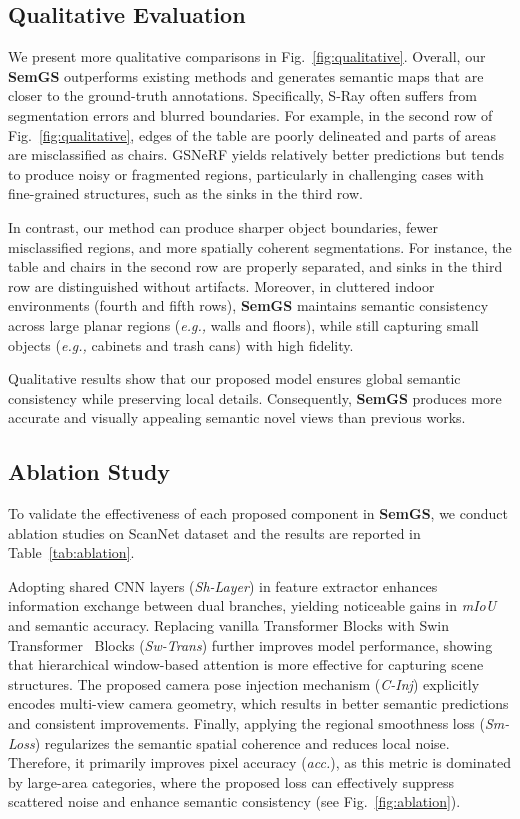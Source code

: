 \documentclass[letterpaper, 10 pt, conference]{ieeeconf}  %
\begin{document}
\subsection{Qualitative Evaluation}
We present more qualitative comparisons in Fig.~\ref{fig:qualitative}. Overall, our \textbf{SemGS} outperforms existing methods and generates semantic maps that are closer to the ground-truth annotations. 
Specifically, S-Ray often suffers from segmentation errors and blurred boundaries. For example, in the second row of Fig.~\ref{fig:qualitative}, edges of the table are poorly delineated and parts of areas are misclassified as chairs. GSNeRF yields relatively better predictions but tends to produce noisy or fragmented regions, particularly in challenging cases with fine-grained structures, such as the sinks in the third row.

In contrast, our method can produce sharper object boundaries, fewer misclassified regions, and more spatially coherent segmentations. For instance, the table and chairs in the second row are properly separated, and sinks in the third row are distinguished without artifacts. Moreover, in cluttered indoor environments (fourth and fifth rows), \textbf{SemGS} maintains semantic consistency across large planar regions (\textit{e.g.,} walls and floors), while still capturing small objects (\textit{e.g.,} cabinets and trash cans) with high fidelity.

Qualitative results show that our proposed model ensures global semantic consistency while preserving local details. Consequently, \textbf{SemGS} produces more accurate and visually appealing semantic novel views than previous works.

\subsection{Ablation Study}
To validate the effectiveness of each proposed component in \textbf{SemGS}, we conduct ablation studies on ScanNet dataset and the results are reported in Table~\ref{tab:ablation}.

Adopting shared CNN layers (\textit{Sh-Layer}) in feature extractor enhances information exchange between dual branches, yielding noticeable gains in \textit{mIoU} and semantic accuracy.
Replacing vanilla Transformer Blocks with Swin Transformer~\cite{swin} Blocks (\textit{Sw-Trans}) further improves model performance, showing that hierarchical window-based attention is more effective for capturing scene structures.
The proposed camera pose injection mechanism (\textit{C-Inj}) explicitly encodes multi-view camera geometry, which results in better semantic predictions and consistent improvements.
Finally, applying the regional smoothness loss (\textit{Sm-Loss}) regularizes the semantic spatial coherence and reduces local noise. Therefore, it primarily improves pixel accuracy (\textit{acc.}), as this metric is dominated by large-area categories, where the proposed loss can effectively suppress scattered noise and enhance semantic consistency (see Fig.~\ref{fig:ablation}).
\end{document}
